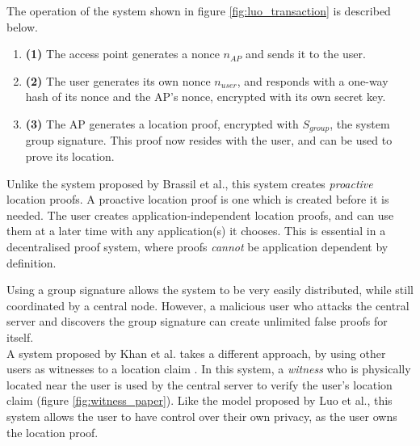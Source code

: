 The operation of the system shown in figure \ref{fig:luo_transaction} is described below.
\begin{enumerate}
\item[] \textbf{(1)} The access point generates a nonce $n_{AP}$ and sends it to the user.
\item[] \textbf{(2)} The user generates its own nonce $n_{user}$, and responds with a one-way hash of its nonce and the AP's nonce, encrypted with its own secret key.
\item[] \textbf{(3)} The AP generates a location proof, encrypted with $S_{group}$, the system group signature. This proof now resides with the user, and can be used to prove its location.
\end{enumerate}

Unlike the system proposed by Brassil et al., this system creates \textit{proactive} location proofs. A proactive location proof is one which is created before it is needed. The user creates application-independent location proofs, and can use them at a later time with any application(s) it chooses. This is essential in a decentralised proof system, where proofs \textit{cannot} be application dependent by definition.

Using a group signature allows the system to be very easily distributed, while still coordinated by a central node. However, a malicious user who attacks the central server and discovers the group signature can create unlimited false proofs for itself.
\\

A system proposed by Khan et al. takes a different approach, by using other users as witnesses to a location claim \cite{khan}. In this system, a \textit{witness} who is physically located near the user is used by the central server to verify the user's location claim (figure \ref{fig:witness_paper}). Like the model proposed by Luo et al., this system allows the user to have control over their own privacy, as the user owns the location proof.

